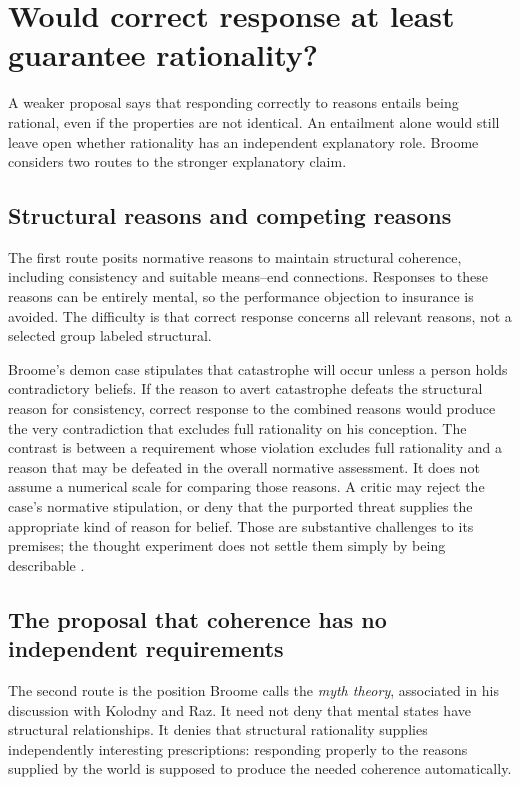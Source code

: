 \section{Would correct response at least guarantee rationality?}
\label{sec:p11-reasons-entailment}

A weaker proposal says that responding correctly to reasons entails being
rational, even if the properties are not identical. An entailment alone
would still leave open whether rationality has an independent explanatory
role. Broome considers two routes to the stronger explanatory claim.

\subsection{Structural reasons and competing reasons}

The first route posits normative reasons to maintain structural coherence,
including consistency and suitable means--end connections. Responses to
these reasons can be entirely mental, so the performance objection to
insurance is avoided. The difficulty is that correct response concerns
all relevant reasons, not a selected group labeled structural.

Broome's demon case stipulates that catastrophe will occur unless a person
holds contradictory beliefs. If the reason to avert catastrophe defeats
the structural reason for consistency, correct response to the combined
reasons would produce the very contradiction that excludes full rationality
on his conception. The contrast is between a requirement whose violation
excludes full rationality and a reason that may be defeated in the overall
normative assessment. It does not assume a numerical scale for comparing
those reasons. A critic may reject the case's normative stipulation, or
deny that the purported threat supplies the appropriate kind of reason for
belief. Those are substantive challenges to its premises; the thought
experiment does not settle them simply by being describable
\parencite[p.~133]{Broome2021ReasonsRationality}.

\subsection{The proposal that coherence has no independent requirements}

The second route is the position Broome calls the \emph{myth theory},
associated in his discussion with Kolodny and Raz. It need not deny that
mental states have structural relationships. It denies that structural
rationality supplies independently interesting prescriptions: responding
properly to the reasons supplied by the world is supposed to produce the
needed coherence automatically.

